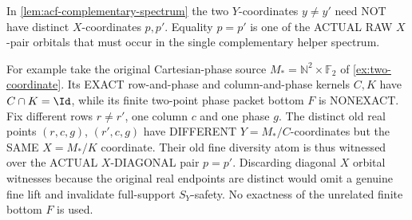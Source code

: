\begin{remark}
\label{rem:acf-opposite-diagonal-fine-lift}
In \cref{lem:acf-complementary-spectrum}
the two \(Y\)-coordinates \(y\ne y'\)
need NOT have distinct
\(X\)-coordinates \(p,p'\).
Equality \(p=p'\) is one of the
ACTUAL RAW \(X\)-pair orbitals
that must occur in the single
complementary helper spectrum.

For example take the original
Cartesian-phase source
\(M_*=\mathbb N^2\times\mathbb F_2\)
of \cref{ex:two-coordinate}.
Its EXACT row-and-phase and
column-and-phase kernels
\(C,K\) have
\(C\cap K=\Id\), while its
finite two-point phase packet
bottom \(F\) is NONEXACT.
Fix different rows \(r\ne r'\),
one column \(c\) and one phase
\(g\). The distinct old real
points \((r,c,g)\),
\((r',c,g)\) have DIFFERENT
\(Y=M_*/C\)-coordinates
but the SAME \(X=M_*/K\)
coordinate. Their old fine
diversity atom is thus
witnessed over the ACTUAL
\(X\)-DIAGONAL pair \(p=p'\).
Discarding diagonal \(X\)
orbital witnesses because
the original real endpoints
are distinct would omit
a genuine fine lift and
invalidate full-support
\(S_Y\)-safety. No exactness
of the unrelated finite
bottom \(F\) is used.
\end{remark}

